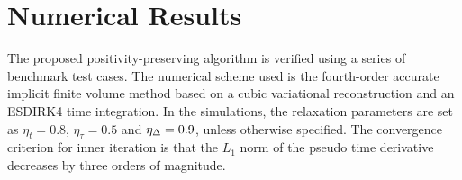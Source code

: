 %
%


\section{Numerical Results}
\label{sec:Results}

The proposed positivity-preserving algorithm is verified using a series of benchmark test cases. The numerical scheme used is the fourth-order accurate implicit finite volume method based on a cubic variational reconstruction and an ESDIRK4 time integration. In the simulations, the relaxation parameters are set as $\eta_t= 0.8$, $\eta_\tau=0.5$ and $\eta_\mathrm\Delta=0.9$, unless otherwise specified. The convergence criterion for inner iteration is that the $L_1$ norm of the pseudo time derivative decreases by three orders of magnitude.


